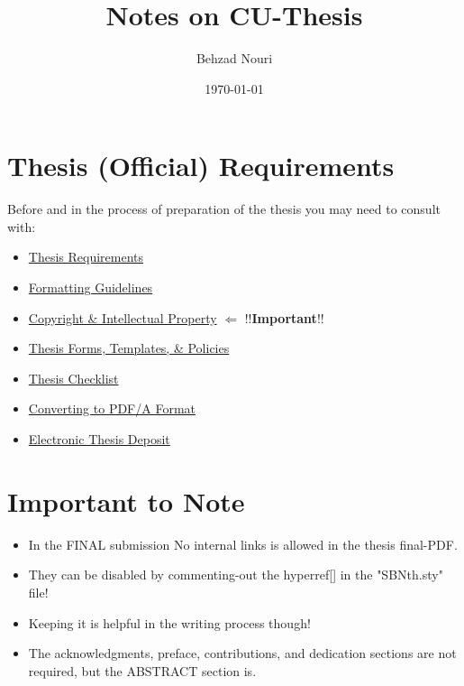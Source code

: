 \documentclass{article}
\title{Notes on CU-Thesis}
\author{Behzad Nouri}
\date{\today}
\begin{document}
\begin{titlepage}
\maketitle
\tableofcontents
{}
\end{titlepage}

\section{Thesis (Official) Requirements}
Before and in the process of preparation of the thesis you may need to consult with:
\begin{itemize}
\item \href{https://gradstudents.carleton.ca/thesis-requirements/}{Thesis Requirements}
\item \href{https://gradstudents.carleton.ca/thesis-requirements/formatting-guidelines/}{Formatting Guidelines}
\item \href{https://gradstudents.carleton.ca/thesis-requirements/copyright/}{Copyright \& Intellectual Property}   {\color{red} $\Longleftarrow$ !!\textbf{Important}!!}
\item \href{https://gradstudents.carleton.ca/thesis-requirements/thesis-forms-templates/}{Thesis Forms, Templates, \& Policies}
\item \href{https://gradstudents.carleton.ca/thesis-requirements/thesis-checklist/}{Thesis Checklist}
\item \href{https://gradstudents.carleton.ca/thesis-requirements/pdfa-formatting/}{Converting to PDF/A Format}
\item \href{https://gradstudents.carleton.ca/thesis-requirements/electronic/}{Electronic Thesis Deposit} 
\end{itemize}

\section{Important to Note}
\begin{itemize}
\item In the FINAL submission No internal links is allowed in the thesis final-PDF. 
\item They can be disabled by commenting-out the hyperref[]{} in the  "SBNth.sty" file!
\item Keeping it is helpful in the writing process though!
\item The acknowledgments, preface, contributions, and dedication sections are not required, but the ABSTRACT section is.
\end{itemize}
\end{document}
